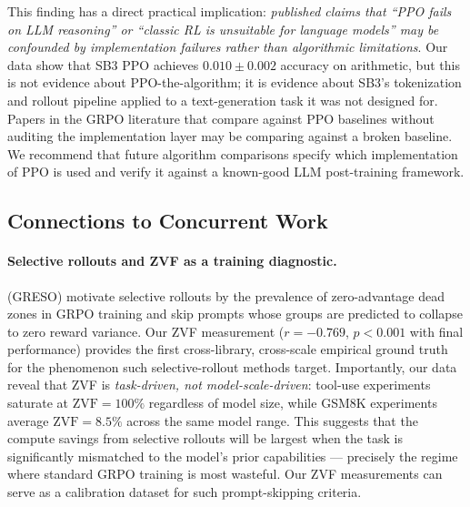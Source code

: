 \documentclass{article}
\begin{document}
This finding has a direct practical implication: \emph{published claims that
``PPO fails on LLM reasoning'' or ``classic RL is unsuitable for language models''
may be confounded by implementation failures rather than algorithmic limitations}.
Our data show that SB3 PPO achieves $0.010 \pm 0.002$ accuracy on arithmetic,
but this is not evidence about PPO-the-algorithm; it is evidence about
SB3's tokenization and rollout pipeline applied to a text-generation task it
was not designed for.
Papers in the GRPO literature that compare against PPO baselines without
auditing the implementation layer may be comparing against a broken baseline.
We recommend that future algorithm comparisons specify which implementation of
PPO is used and verify it against a known-good LLM post-training framework.

\subsection{Connections to Concurrent Work}
\label{sec:discuss_related}

\paragraph{Selective rollouts and ZVF as a training diagnostic.}
\citet{zhang2026greso} (GRESO) motivate selective rollouts by the prevalence of
zero-advantage dead zones in GRPO training and skip prompts whose groups are
predicted to collapse to zero reward variance.
Our ZVF measurement ($r = -0.769$, $p < 0.001$ with final performance) provides
the first cross-library, cross-scale empirical ground truth for the phenomenon
such selective-rollout methods target.
Importantly, our data reveal that ZVF is \emph{task-driven, not model-scale-driven}:
tool-use experiments saturate at $\text{ZVF} = 100\%$ regardless of model size,
while GSM8K experiments average $\text{ZVF} = 8.5\%$ across the same model
range.
This suggests that the compute savings from selective rollouts will be largest
when the task is significantly mismatched to the model's prior capabilities
--- precisely the regime where standard GRPO training is most wasteful.
Our ZVF measurements can serve as a calibration dataset for such prompt-skipping
criteria.
\end{document}
